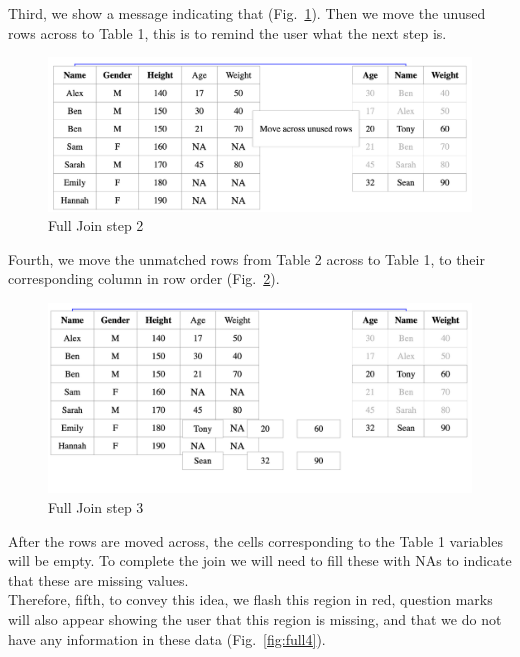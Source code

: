 \newpage
Third, we show a message indicating that (Fig.~\ref{fig:full2}). Then we move the unused rows across to Table 1, this is to remind the user what the next step is.

\begin{figure}[H]
    \includegraphics[scale = 0.25]{Masters-Thesis/img/full2.png}
    \caption{Full Join step 2}
    \label{fig:full2}
\end{figure}

Fourth, we move the unmatched rows from Table 2 across to Table 1, to their corresponding column in row order (Fig.~\ref{fig:full3}).

\begin{figure}[H]
    \includegraphics[scale = 0.25]{Masters-Thesis/img/full3.png}
    \caption{Full Join step 3}
    \label{fig:full3}
\end{figure}

\newpage

After the rows are moved across, the cells corresponding to the Table 1 variables will be empty. To complete the join we will need to fill these with NAs to indicate that these are missing values. \\

Therefore, fifth, to convey this idea, we flash this region in red, question marks will also appear showing the user that this region is missing, and that we do not have any information in these data (Fig.~\ref{fig:full4}). 

